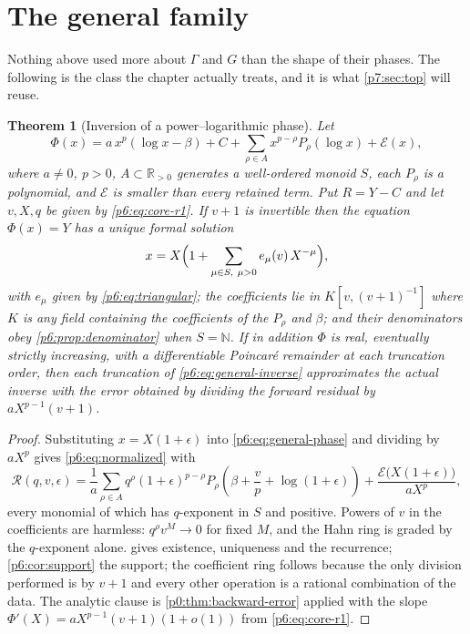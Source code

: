 \documentclass[11pt,a4paper,oneside]{book}
\theoremstyle{plain}
\newtheorem{theorem}{Theorem}[chapter]
\theoremstyle{definition}
\theoremstyle{remark}
\newcommand{\Nat}{\mathbb{N}}
\newcommand{\Real}{\mathbb{R}}
\newcommand{\littleo}{o}
\begin{document}
\section{The general family}
\label{p6:sec:general}

Nothing above used more about $\Gamma$ and $G$ than the shape of their
phases.  The following is the class the chapter actually treats, and it is
what \cref{p7:sec:top} will reuse.

\begin{theorem}[Inversion of a power--logarithmic phase]\label{p6:thm:general}
Let
\begin{equation}\label{p6:eq:general-phase}
 \Phi(x)=a\,x^{p}(\log x-\beta)+C
 +\sum_{\rho\in A}x^{p-\rho}P_\rho(\log x)+\mathcal{E}(x),
\end{equation}
where $a\ne0$, $p>0$, $A\subset\Real_{>0}$ generates a well-ordered monoid $S$,
each $P_\rho$ is a polynomial, and $\mathcal{E}$ is smaller than every
retained term.  Put $R=Y-C$ and let $v,X,q$ be given by
\eqref{p6:eq:core-r1}.  If $v+1$ is invertible then the equation
$\Phi(x)=Y$ has a unique formal solution
\begin{equation}\label{p6:eq:general-inverse}
 x=X\Bigl(1+\sum_{\mu\in S,\ \mu>0}e_\mu(v)\,X^{-\mu}\Bigr),
\end{equation}
with $e_\mu$ given by \eqref{p6:eq:triangular}; the coefficients lie in
$K[v,(v+1)^{-1}]$ where $K$ is any field containing the coefficients of the
$P_\rho$ and $\beta$; and their denominators obey
\cref{p6:prop:denominator} when $S=\Nat$.  If in addition $\Phi$ is real,
eventually strictly increasing, with a differentiable Poincar\'e remainder at
each truncation order, then each truncation of \eqref{p6:eq:general-inverse}
approximates the actual inverse with the error obtained by dividing the
forward residual by $a X^{p-1}(v+1)$.
\end{theorem}

\begin{proof}
Substituting $x=X(1+\epsilon)$ into \eqref{p6:eq:general-phase} and dividing
by $aX^{p}$ gives \eqref{p6:eq:normalized} with
\[
 \mathcal{R}(q,v,\epsilon)
 =\frac1a\sum_{\rho\in A}q^{\rho}(1+\epsilon)^{p-\rho}
 P_\rho\!\left(\beta+\frac vp+\log(1+\epsilon)\right)
 +\frac{\mathcal{E}\bigl(X(1+\epsilon)\bigr)}{aX^{p}},
\]
every monomial of which has $q$-exponent in $S$ and positive.  Powers of $v$
in the coefficients are harmless: $q^{\rho}v^{M}\to0$ for fixed $M$, and the
Hahn ring is graded by the $q$-exponent alone.   gives
existence, uniqueness and the recurrence; \cref{p6:cor:support} the support;
the coefficient ring follows because the only division performed is by $v+1$
and every other operation is a rational combination of the data.  The analytic
clause is \cref{p0:thm:backward-error} applied with the slope
$\Phi'(X)=aX^{p-1}(v+1)(1+\littleo(1))$ from \eqref{p6:eq:core-r1}.
\end{proof}
\end{document}

